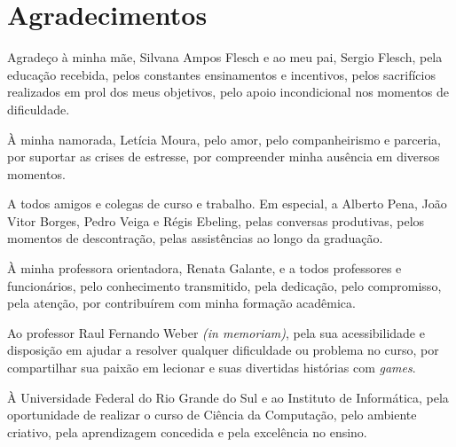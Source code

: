 \chapter*{Agradecimentos}
Agradeço à minha mãe, Silvana Ampos Flesch e ao meu pai, Sergio Flesch, pela educação recebida, pelos constantes ensinamentos e incentivos, pelos sacrifícios realizados em prol dos meus objetivos, pelo apoio incondicional nos momentos de dificuldade.

À minha namorada, Letícia Moura, pelo amor, pelo companheirismo e parceria, por suportar as crises de estresse, por compreender minha ausência em diversos momentos.

A todos amigos e colegas de curso e trabalho. Em especial, a Alberto Pena, João Vitor Borges, Pedro Veiga e Régis Ebeling, pelas conversas produtivas, pelos momentos de descontração, pelas assistências ao longo da graduação.

À minha professora orientadora, Renata Galante, e a todos professores e funcionários, pelo conhecimento transmitido, pela dedicação, pelo compromisso, pela atenção, por contribuírem com minha formação acadêmica.

Ao professor Raul Fernando Weber \textit{(in memoriam)}, pela sua acessibilidade e disposição em ajudar a resolver qualquer dificuldade ou problema no curso, por compartilhar sua paixão em lecionar e suas divertidas histórias com \textit{games}.

À Universidade Federal do Rio Grande do Sul e ao Instituto de Informática, pela oportunidade de realizar o curso de Ciência da Computação, pelo ambiente criativo, pela aprendizagem concedida e pela excelência no ensino.